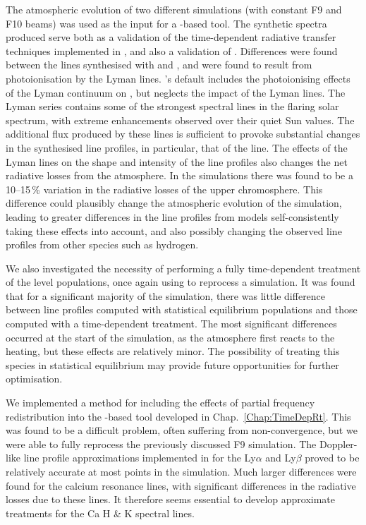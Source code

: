 The atmospheric evolution of two different \Radyn{} simulations (with constant F9 and F10 beams) was used as the input for a \Lw{}-based tool.
The synthetic spectra produced serve both as a validation of the time-dependent radiative transfer techniques implemented in \Lw{}, and also a validation of \Radyn{}.
Differences were found between the \Caii{} lines synthesised with \Radyn{} and \Lw{}, and were found to result from photoionisation by the Lyman lines.
\Radyn{}'s default includes the photoionising effects of the Lyman continuum on \Caii{}, but neglects the impact of the Lyman lines.
The Lyman series contains some of the strongest spectral lines in the flaring solar spectrum, with extreme enhancements observed over their quiet Sun values.
The additional flux produced by these lines is sufficient to provoke substantial changes in the synthesised \Caii{} line profiles, in particular, that of the \CaLine{} line.
The effects of the Lyman lines on the shape and intensity of the \Caii{} line profiles also changes the net radiative losses from the atmosphere.
In the simulations there was found to be a 10--15\,\% variation in the radiative losses of the upper chromosphere.
This difference could plausibly change the atmospheric evolution of the simulation, leading to greater differences in the \Caii{} line profiles from models self-consistently taking these effects into account, and also possibly changing the observed line profiles from other species such as hydrogen.

We also investigated the necessity of performing a fully time-dependent treatment of the \Caii{} level populations, once again using \Lw{} to reprocess a \Radyn{} simulation.
It was found that for a significant majority of the simulation, there was little difference between line profiles computed with statistical equilibrium populations and those computed with a time-dependent treatment.
The most significant differences occurred at the start of the simulation, as the atmosphere first reacts to the heating, but these effects are relatively minor.
The possibility of treating this species in statistical equilibrium may provide future opportunities for further optimisation.

We implemented a method for including the effects of partial frequency redistribution into the \Lw{}-based tool developed in Chap.~\ref{Chap:TimeDepRt}.
This was found to be a difficult problem, often suffering from non-convergence, but we were able to fully reprocess the previously discussed F9 simulation.
The Doppler-like line profile approximations implemented in \Radyn{} for the Ly$\alpha$ and Ly$\beta$ proved to be relatively accurate at most points in the simulation.
Much larger differences were found for the calcium resonance lines, with significant differences in the radiative losses due to these lines.
It therefore seems essential to develop approximate treatments for the Ca H \& K spectral lines.

